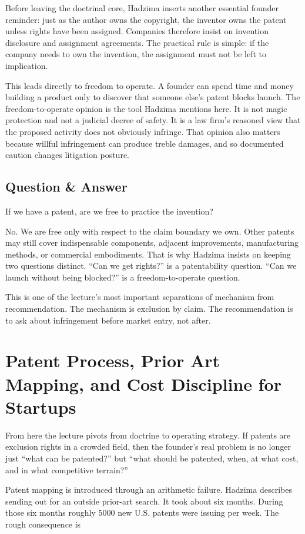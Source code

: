 Before leaving the doctrinal core, Hadzima inserts another essential founder reminder: just as the author owns the copyright, the inventor owns the patent unless rights have been assigned. Companies therefore insist on invention disclosure and assignment agreements. The practical rule is simple: if the company needs to own the invention, the assignment must not be left to implication.

This leads directly to freedom to operate. A founder can spend time and money building a product only to discover that someone else's patent blocks launch. The freedom-to-operate opinion is the tool Hadzima mentions here. It is not magic protection and not a judicial decree of safety. It is a law firm's reasoned view that the proposed activity does not obviously infringe. That opinion also matters because willful infringement can produce treble damages, and so documented caution changes litigation posture.

\subsection{Question \& Answer}

If we have a patent, are we free to practice the invention?

No. We are free only with respect to the claim boundary we own. Other patents may still cover indispensable components, adjacent improvements, manufacturing methods, or commercial embodiments. That is why Hadzima insists on keeping two questions distinct. ``Can we get rights?'' is a patentability question. ``Can we launch without being blocked?'' is a freedom-to-operate question.

This is one of the lecture's most important separations of mechanism from recommendation. The mechanism is exclusion by claim. The recommendation is to ask about infringement before market entry, not after.

\section{Patent Process, Prior Art Mapping, and Cost Discipline for Startups}

From here the lecture pivots from doctrine to operating strategy. If patents are exclusion rights in a crowded field, then the founder's real problem is no longer just ``what can be patented?'' but ``what should be patented, when, at what cost, and in what competitive terrain?''

Patent mapping is introduced through an arithmetic failure. Hadzima describes sending out for an outside prior-art search. It took about six months. During those six months roughly \(5000\) new U.S. patents were issuing per week. The rough consequence is

